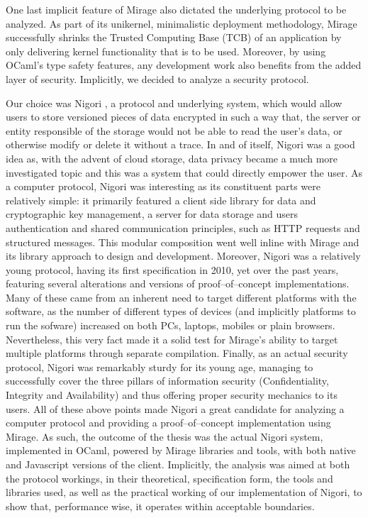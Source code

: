 One last implicit feature of Mirage also dictated the underlying protocol to be analyzed.
As part of its unikernel, minimalistic deployment methodology, Mirage successfully shrinks the Trusted Computing Base (TCB) of an application by only delivering kernel functionality that is to be used.
Moreover, by using OCaml's type safety features, any development work also benefits from the added layer of security.
Implicitly, we decided to analyze a security protocol.

Our choice was Nigori \cite{NigoriDraft}, a protocol and underlying system, which would allow users to store versioned pieces of data encrypted in such a way that, the server or entity responsible of the storage would not be able to read the user's data, or otherwise modify or delete it without a trace.
In and of itself, Nigori was a good idea as, with the advent of cloud storage, data privacy became a much more investigated topic and this was a system that could directly empower the user.
As a computer protocol, Nigori was interesting as its constituent parts were relatively simple: it primarily featured a client side library for data and cryptographic key management, a server for data storage and users authentication and shared communication principles, such as HTTP requests and structured messages.
This modular composition went well inline with Mirage and its library approach to design and development.
Moreover, Nigori was a relatively young protocol, having its first specification in 2010, yet over the past years, featuring several alterations and versions of proof--of--concept implementations.
Many of these came from an inherent need to target different platforms with the software, as the number of different types of devices (and implicitly platforms to run the sofware) increased on both PCs, laptops, mobiles or plain browsers.
Nevertheless, this very fact made it a solid test for Mirage's ability to target multiple platforms through separate compilation.
Finally, as an actual security protocol, Nigori was remarkably sturdy for its young age, managing to successfully cover the three pillars of information security (Confidentiality, Integrity and Availability) and thus offering proper security mechanics to its users.
All of these above points made Nigori a great candidate for analyzing a computer protocol and providing a proof--of--concept implementation using Mirage.
As such, the outcome of the thesis was the actual Nigori system, implemented in OCaml, powered by Mirage libraries and tools, with both native and Javascript versions of the client.
Implicitly, the analysis was aimed at both the protocol workings, in their theoretical, specification form, the tools and libraries used, as well as the practical working of our implementation of Nigori, to show that, performance wise, it operates within acceptable boundaries.

